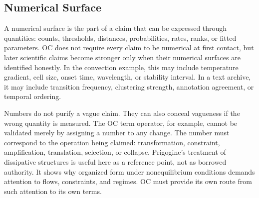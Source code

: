 \documentclass[11pt,a4paper,openany]{book}
\begin{document}
\subsection{Numerical Surface}
A numerical surface is the part of a claim that can be expressed through quantities: counts, thresholds, distances, probabilities, rates, ranks, or fitted parameters. OC does not require every claim to be numerical at first contact, but later scientific claims become stronger only when their numerical surfaces are identified honestly. In the convection example, this may include temperature gradient, cell size, onset time, wavelength, or stability interval. In a text archive, it may include transition frequency, clustering strength, annotation agreement, or temporal ordering. \cite{wilson_renormalization,landau_stat_physics}\par
Numbers do not purify a vague claim. They can also conceal vagueness if the wrong quantity is measured. The OC term operator, for example, cannot be validated merely by assigning a number to any change. The number must correspond to the operation being claimed: transformation, constraint, amplification, translation, selection, or collapse. Prigogine's treatment of dissipative structures is useful here as a reference point, not as borrowed authority. It shows why organized form under nonequilibrium conditions demands attention to flows, constraints, and regimes. OC must provide its own route from such attention to its own terms.\par
\end{document}
